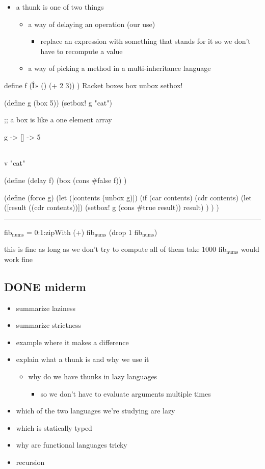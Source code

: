 \documentclass[11pt]{article}
\begin{document}
\begin{itemize}
\item a thunk is one of two things
\begin{itemize}
\item a way of delaying an operation (our use)
\begin{itemize}
\item replace an expression with something that stands for it so we don't have to recompute a value
\end{itemize}
\item a way of picking a method in a multi-inheritance language
\end{itemize}
\end{itemize}

define f (Î» () (+ 2 3)) )
Racket boxes
box
unbox
setbox!

(define g (box 5))
(setbox! g "cat")

;; a box is like a one element array

g -> [] -> 5
\begin{center}
\begin{tabular}{}
\\
\end{tabular}
\end{center}
  v
"cat"

(define (delay f)
    (box (cons \#false f))
)

(define (force g)
  (let ([contents (unbox g)])
  (if (car contents)
      (cdr contents)
      (let ([result ((cdr contents))])
           (setbox! g (cons \#true result))
           result)
  )
  )
)


\rule{\linewidth}{0.5pt}
fib$_{\text{nums}}$ = 0:1:zipWith (+) fib$_{\text{nums}}$ (drop 1 fib$_{\text{nums}}$)

this is fine as long as we don't try to compute all of them
take 1000 fib$_{\text{nums}}$
would work fine

\subsection{{\bfseries\sffamily DONE} miderm}
\label{sec-9-1}
\begin{itemize}
\item summarize laziness
\item summarize strictness
\item example where it makes a difference
\item explain what a thunk is and why we use it
\begin{itemize}
\item why do we have thunks in lazy languages
\begin{itemize}
\item so we don't have to evaluate arguments multiple times
\end{itemize}
\end{itemize}
\item which of the two languages we're studying are lazy
\item which is statically typed
\item why are functional languages tricky
\item recursion
\end{itemize}
\end{document}
